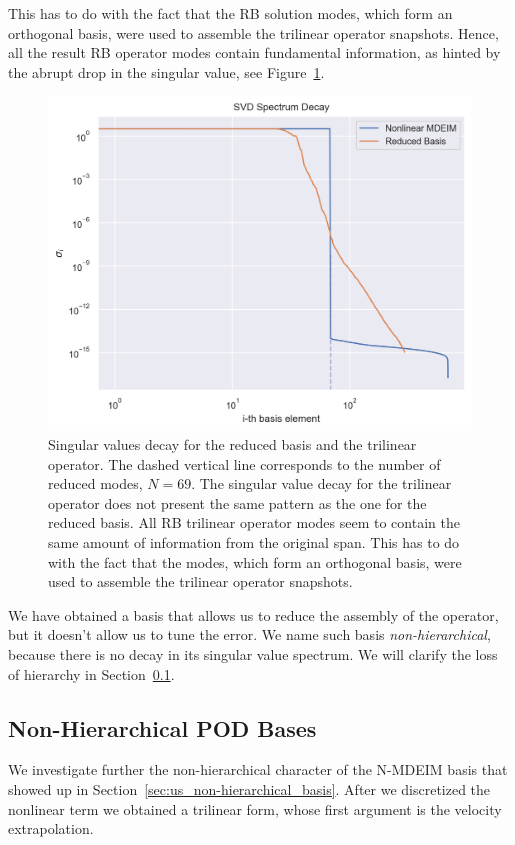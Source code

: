 \documentclass[../../thesis.tex]{subfiles}
\begin{document}
This has to do with the fact that the RB solution modes,
which form an orthogonal basis, were used to assemble the trilinear operator snapshots.
Hence, all the result RB operator modes contain fundamental information,
as hinted by the abrupt drop in the singular value, see Figure~\ref{fig:sigmas_decay}. 
\begin{figure}
    \centering
    \includegraphics[width=1\columnwidth]{research_project/piston/figures/mdeim_certification/sigmas_problem.png}
    \caption{Singular values decay for the reduced basis and the trilinear operator.
    The dashed vertical line corresponds to the number of reduced modes, $N=69$.
    The singular value decay for the trilinear operator does 
    not present the same pattern as the one for the reduced basis.
    All RB trilinear operator modes 
    seem to contain the same amount of information from the original span.
    This has to do with the fact that the modes,
    which form an orthogonal basis, 
    were used to assemble the trilinear operator snapshots.}
    \label{fig:sigmas_decay}
\end{figure}
We have obtained a basis that allows us to reduce the assembly of the operator, 
but it doesn't allow us to tune the error.
We name such basis \textit{non-hierarchical}, 
because there is no decay in its singular value spectrum.
We will clarify the loss of hierarchy in Section~\ref{sec:nonhierachical_pod_bases}.

\newpage
\subsection{Non-Hierarchical POD Bases}
\label{sec:nonhierachical_pod_bases}
We investigate further the non-hierarchical character of the N-MDEIM basis
that showed up in Section~\ref{sec:us_non-hierarchical_basis}.
After we discretized the nonlinear term we obtained a trilinear form,
whose first argument is the velocity extrapolation.
\end{document}
